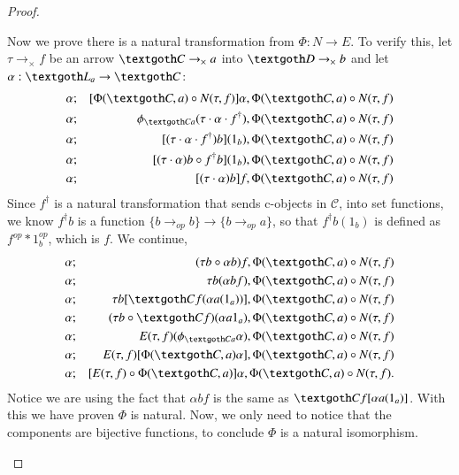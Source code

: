 \documentclass [12pt]{book}
\begin{document}
\begin{proof}
\begin{itemize}
Now we prove there is a natural transformation from $\Phi:N\rightarrow E$. To verify this, let $\tau\rightarrow_\times f$ be an arrow $\textgoth C\rightarrow_\times a$ into $\textgoth D\rightarrow_\times b$ and let $\alpha:\textgoth L_a\rightarrow\textgoth C$:\begin{eqnarray}\nonumber \alpha&;&[\Phi(\textgoth C,a)\circ N(\tau,f)]\alpha,\Phi(\textgoth C,a)\circ N(\tau,f)\\\nonumber\alpha&;&\phi_{\textgoth Ca}(\tau\cdot\alpha\cdot f^\dagger),\Phi(\textgoth C,a)\circ N(\tau,f)\\\nonumber\alpha&;&[(\tau \cdot\alpha\cdot f^\dagger)b](1_b),\Phi(\textgoth C,a)\circ N(\tau,f)\\\nonumber\alpha&;&[(\tau\cdot\alpha)b\circ f^\dagger b](1_b),\Phi(\textgoth C,a)\circ N(\tau,f)\\\nonumber\alpha&;&[(\tau\cdot\alpha)b]f,\Phi(\textgoth C,a)\circ N(\tau,f)\end{eqnarray}Since $f^\dagger$ is a natural transformation that sends c-objects in $\mathcal C$, into set functions, we know $f^\dagger b$ is a function $\{b\rightarrow_{op} b\}\rightarrow\{b\rightarrow_{op}a \}$, so that $f^\dagger b(1_b)$ is defined as $f^{op}*1_b^{op}$, which is $f$. We continue,\begin{eqnarray}\nonumber\alpha&;&(\tau b\circ\alpha b)f,\Phi(\textgoth C,a)\circ N(\tau,f)\\\nonumber\alpha&;&\tau b(\alpha bf),\Phi(\textgoth C,a)\circ N(\tau,f)\\\nonumber\alpha&;&\tau b[\textgoth Cf(\alpha a(1_a))],\Phi(\textgoth C,a)\circ N(\tau,f)\\\nonumber\alpha&;&(\tau b\circ\textgoth Cf)(\alpha a1_a),\Phi(\textgoth C,a)\circ N(\tau,f)\\\nonumber\alpha&;&E(\tau,f)(\phi_{\textgoth Ca}\alpha),\Phi(\textgoth C,a)\circ N(\tau,f)\\\nonumber\alpha&;&E(\tau,f)[\Phi(\textgoth C,a)\alpha],\Phi(\textgoth C,a)\circ N(\tau,f)\\\nonumber\alpha&;&[E(\tau,f)\circ\Phi(\textgoth C,a)]\alpha,\Phi(\textgoth C,a)\circ N(\tau,f).\end{eqnarray}Notice we are using the fact that $\alpha bf$ is the same as $\textgoth Cf[\alpha a(1_a)]$. With this we have proven $\Phi$ is natural. Now, we only need to notice that the components are bijective functions, to conclude $\Phi$ is a natural isomorphism.\end{itemize}\end{proof}
\end{document}
